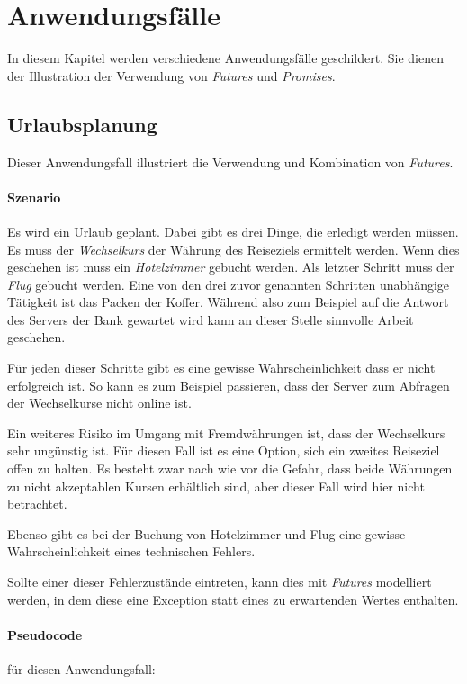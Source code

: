 \section{Anwendungsfälle}

In diesem Kapitel werden verschiedene Anwendungsfälle geschildert.
Sie dienen der Illustration der Verwendung von \emph{Futures} und
\emph{Promises}.

\subsection{Urlaubsplanung}

Dieser Anwendungsfall illustriert die Verwendung und Kombination
von \emph{Futures}.

\paragraph{Szenario}

Es wird ein Urlaub geplant. Dabei gibt es drei Dinge, die erledigt
werden müssen. Es muss der \emph{Wechselkurs} der Währung des
Reiseziels ermittelt werden. Wenn dies geschehen ist muss ein
\emph{Hotelzimmer} gebucht werden. Als letzter Schritt muss der
\emph{Flug} gebucht werden. Eine von den drei zuvor genannten
Schritten unabhängige Tätigkeit ist das Packen der Koffer. Während
also zum Beispiel auf die Antwort des Servers der Bank gewartet wird
kann an dieser Stelle sinnvolle Arbeit geschehen.

Für jeden dieser Schritte gibt es eine gewisse Wahrscheinlichkeit
dass er nicht erfolgreich ist. So kann es zum Beispiel passieren,
dass der Server zum Abfragen der Wechselkurse nicht online ist.

Ein weiteres Risiko im Umgang mit Fremdwährungen ist, dass der
Wechselkurs sehr ungünstig ist. Für diesen Fall ist es eine Option,
sich ein zweites Reiseziel offen zu halten. Es besteht zwar nach wie
vor die Gefahr, dass beide Währungen zu nicht akzeptablen Kursen 
erhältlich sind, aber dieser Fall wird hier nicht betrachtet.

Ebenso gibt es bei der Buchung von Hotelzimmer und Flug eine gewisse
Wahrscheinlichkeit eines technischen Fehlers.

Sollte einer dieser Fehlerzustände eintreten, kann dies mit
\emph{Futures} modelliert werden, in dem diese eine Exception
statt eines zu erwartenden Wertes enthalten.

\paragraph{Pseudocode} für diesen Anwendungsfall:

